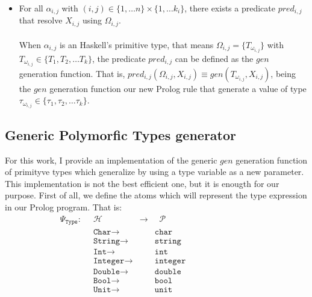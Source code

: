 \documentclass{report}
\theoremstyle{definition}
\newtheorem{example}{Example}[section]
\theoremstyle{definition}
\newcommand{\ttt}[1]{\texttt{#1}}
\newcommand{\tav}{\;\;}
\begin{document}
\begin{itemize}
\begin{example}
\begin{itemize}
			\item As \ttt{Nil2} constructor doesn't require any type to be defined, therefore $\Omega_{2,1} = \emptyset \in P(\{ \ttt{A} , \ttt{B} \})$.
			\item As \ttt{Some} constructor requires \ttt{a}, that is, $\alpha_{3,1} = \ttt{a}$ and it needs $\ttt{a}$ to be defined, therefore $\Omega_{3,1} = \{\ttt{A}\} \in P(\{ \ttt{A} , \ttt{B} \})$.
			\item As $\ttt{Weird}$ constructor requires both types \ttt{SomeWeird a b} and \ttt{b}, that is, $\alpha_{4,1} = \alpha_{4,2} = \ttt{SomeWeird a b}$ and $\alpha_{4,3} = \ttt{b}$, therefore $\Omega_{4,1} = \Omega_{4,2} = \{\ttt{A}, \ttt{B}\} \in P(\{ \ttt{A} , \ttt{B} \})$ and $\Omega_{4,3} = \{\ttt{B}\} \in P(\{ \ttt{A} , \ttt{B} \})$.
		\end{itemize}
	\end{example}
	\item For all $\alpha_{i,j}$ with $(i,j) \in \{1, \ldots n \} \times \{1, \ldots k_i \}$, there exists a predicate $pred_{i,j}$ that resolve $X_{i,j}$ using $\Omega_{i,j}$.\\\\
	When $\alpha_{i,j}$ is an Haskell's primitive type, that means $\Omega_{i,j} = \{T_{\omega_{i,j}}\}$ with $T_{\omega_{i,j}} \in \{ T_1 , T_2, \ldots T_k \}$, the predicate $pred_{i,j}$ can be defined as the $gen$ generation function. That is, $pred_{i,j}(\Omega_{i,j}, X_{i,j}) \equiv gen(T_{\omega_{i,j}}, X_{i,j})$, being the $gen$ generation function our new Prolog rule that generate a value of type $\tau_{\omega_{i,j}} \in \{ \tau_1 , \tau_2, \ldots \tau_k \}$.
\end{itemize}
\subsection{Generic Polymorfic Types generator}
For this work, I provide an implementation of the generic $gen$ generation function of primityve types which generalize by using a type variable as a new parameter. This implementation is not the best efficient one, but it is enougth for our purpose. First of all, we define the atoms which will represent the type expression in our Prolog program. That is:
\begin{align*}
	\Psi_{\ttt{Type}}:  & \tav \mathcal{H} \tav & \longrightarrow & \tav \mathcal{P}&\\
	&\tav \ttt{Char}  \longrightarrow && \ttt{char}&&&&&&&&&&\\
	&\tav \ttt{String}  \longrightarrow && \ttt{string}&&&&&&&&&&\\
	&\tav \ttt{Int}  \longrightarrow && \ttt{int}&&&&&&&&&&\\
	&\tav \ttt{Integer}  \longrightarrow && \ttt{integer}&&&&&&&&&&\\
	&\tav \ttt{Double}  \longrightarrow && \ttt{double}&&&&&&&&&&\\
	&\tav \ttt{Bool}  \longrightarrow && \ttt{bool}&&&&&&&&&&\\
	&\tav \ttt{Unit}  \longrightarrow && \ttt{unit}&&&&&&&&&&\\
\end{align*}
\pagebreak
\end{document}
